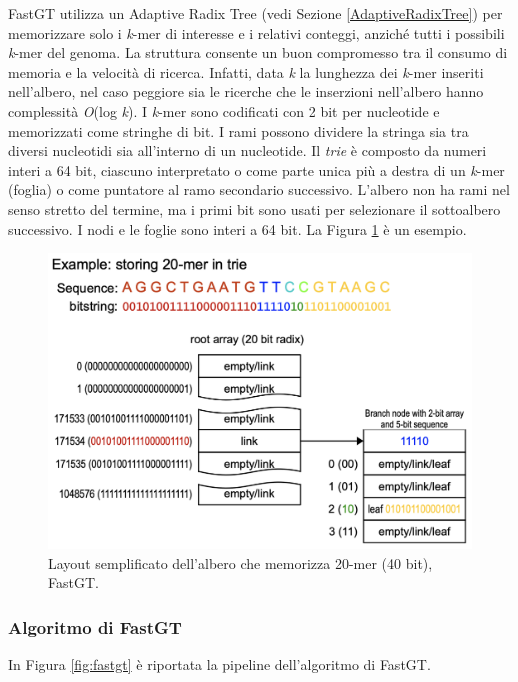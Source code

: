 \documentclass[../main.tex]{subfiles}
\begin{document}
\noindent
FastGT utilizza un Adaptive Radix Tree (vedi Sezione \ref{AdaptiveRadixTree}) per memorizzare solo i \textit{k}-mer di interesse e i relativi conteggi, anziché tutti i possibili \textit{k}-mer del genoma. La struttura consente un buon compromesso tra il consumo di memoria e la velocità di ricerca. Infatti, data \textit{k} la lunghezza dei \textit{k}-mer inseriti nell'albero, nel caso peggiore sia le ricerche che le inserzioni nell'albero hanno complessità \textit{O}(log \textit{k}). I \textit{k}-mer sono codificati con 2 bit per nucleotide e memorizzati come stringhe di bit. I rami possono dividere la stringa sia tra diversi nucleotidi sia all'interno di un nucleotide. Il \textit{trie} è composto da numeri interi a 64 bit, ciascuno interpretato o come parte unica più a destra di un \textit{k}-mer (foglia) o come puntatore al ramo secondario successivo. L'albero non ha rami nel senso stretto del termine, ma i primi bit sono usati per selezionare il sottoalbero successivo. I nodi e le foglie sono interi a 64 bit. La Figura \ref{fig:art} è un esempio.

\begin{figure}[h!]
	\centering
  	\captionsetup{justification=centering}
  	\includegraphics[scale=.35]{images/fastgt-art.png}
  	\caption{Layout semplificato dell'albero che memorizza 20-mer (40 bit), FastGT.}
  	\label{fig:art}
\end{figure}


\subsubsection{Algoritmo di FastGT}

In Figura \ref{fig:fastgt} è riportata la pipeline dell'algoritmo di FastGT.
\end{document}
